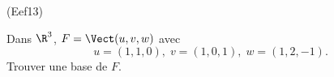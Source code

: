 \begin{tiny}(Eef13)\end{tiny} Dans $\R^3$, $F = \Vect(u,v,w)$ avec
\[
 u = (1,1,0), \; v = (1,0,1),\; w = (1,2,-1).
\]
Trouver une base de $F$.